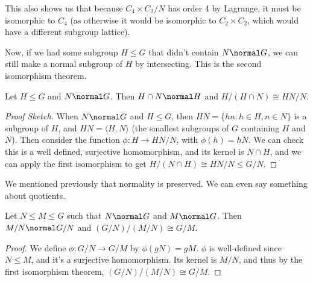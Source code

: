 \documentclass[a4paper]{scrartcl}
\begin{document}
\begin{example}
\begin{center}


	\end{center}
	This also shows us that because $C_4 \times C_2 / N$ has order 4 by Lagrange, it must be isomorphic to $C_4$ (as otherwise it would be isomorphic to $C_2 \times C_2$, which would have a different subgroup lattice).
\end{example}

Now, if we had some subgroup $H \leq G$ that didn't contain $N \normal G$, we can still make a normal subgroup of $H$ by intersecting. This is the second isomorphism theorem.

\begin{theorem}
	Let $H \leq G$ and $N \normal G$. Then $H \cap N \normal H$ and $H/(H \cap N) \cong HN / N$.
\end{theorem}
\begin{proof}[Proof Sketch]
	When $N \normal G$ and $H \leq G$, then $HN = \{ hn : h \in H, n \in N\}$ is a subgroup of $H$, and $HN = \langle H, N \rangle$ (the smallest subgroups of $G$ containing $H$ and $N$). Then consider the function $\phi : H \rightarrow HN/N$, with $\phi(h) = hN$. We can check this is a well defined, surjective homomorphism, and its kernel is $N \cap H$, and we can apply the first isomorphism to get $H/(N \cap H) \cong HN/N \leq G/N$.
\end{proof}

We mentioned previously that normality is preserved. We can even say something about quotients.

\begin{theorem}
	Let $N \leq M \leq G$ such that $N \normal G$ and $M \normal G$. Then $M/N \normal G/N$ and $(G/N) / (M/N) \cong G/M$.
\end{theorem}
\begin{proof}
	We define $\phi: G/N \rightarrow G/M$ by $\phi(gN) = gM$. $\phi$ is well-defined since $N \leq M$, and it's a surjective homomorphism. Its kernel is $M/N$, and thus by the first isomorphism theorem, $(G/N) / (M/N) \cong G/M$.
\end{proof}
\end{document}
